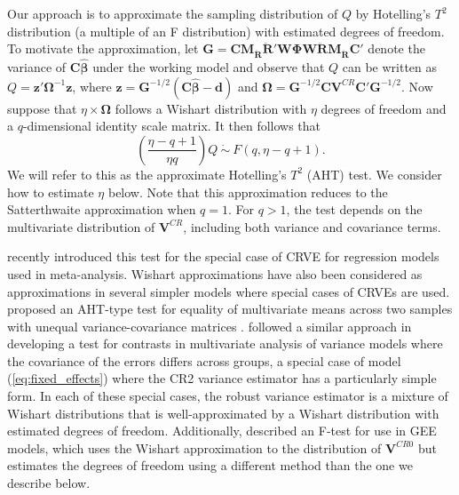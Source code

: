 \documentclass[12pt]{article}\usepackage[]{graphicx}\usepackage[]{color}
\newcommand{\bm}{\mathbf}
\newcommand{\bs}{\boldsymbol}
\begin{document}
Our approach is to approximate the sampling distribution of $Q$ by Hotelling's $T^2$ distribution (a multiple of an F distribution) with estimated degrees of freedom. To motivate the approximation, let $\bm{G} = \bm{C} \bm{M_{\ddot{R}}}\bm{\ddot{R}}'\bm{W}\bs\Phi\bm{W}\bm{\ddot{R}}\bm{M_{\ddot{R}}} \bm{C}'$ denote the variance of $\bm{C}\bs{\hat\beta}$ under the working model and observe that $Q$ can be written as $Q = \bm{z}' \bs\Omega^{-1} \bm{z}$, where $\bm{z} = \bm{G}^{-1/2}\left(\bm{C}\bs{\hat\beta} - \bm{d}\right)$ and $\bs\Omega = \bm{G}^{-1/2} \bm{C} \bm{V}^{CR}\bm{C}'\bm{G}^{-1/2}$. 
Now suppose that $\eta \times \bs\Omega$ follows a Wishart distribution with $\eta$ degrees of freedom and a $q$-dimensional identity scale matrix. It then follows that
\begin{equation}
\label{eq:AHT}
\left(\frac{\eta - q + 1}{\eta q}\right) Q \ \dot\sim \ F(q, \eta - q + 1).
\end{equation}
We will refer to this as the approximate Hotelling's $T^2$ (AHT) test.
We consider how to estimate $\eta$ below.
Note that this approximation reduces to the Satterthwaite approximation when $q = 1$. 
For $q > 1$, the test depends on the multivariate distribution of $\bm{V}^{CR}$, including both variance and covariance terms. 

 recently introduced this test for the special case of CRVE for regression models used in meta-analysis.
Wishart approximations have also been considered as approximations in several simpler models where special cases of CRVEs are used.
\citet{Nel1986solution} proposed an AHT-type test for equality of multivariate means across two samples with unequal variance-covariance matrices \citep[i.e., the multivariate Behrens-Fisher problem; see also][]{Krishnamoorthy2004modified}.
\citet{Zhang2012twowayANOVA} followed a similar approach in developing a test for contrasts in multivariate analysis of variance models where the covariance of the errors differs across groups, a special case of model (\ref{eq:fixed_effects}) where the CR2 variance estimator has a particularly simple form. 
In each of these special cases, the robust variance estimator is a mixture of Wishart distributions that is well-approximated by a Wishart distribution with estimated degrees of freedom.
Additionally, \citet{Pan2002small} described an F-test for use in GEE models, which uses the Wishart approximation to the distribution of $\bm{V}^{CR0}$ but estimates the degrees of freedom using a different method than the one we describe below.
\end{document}

